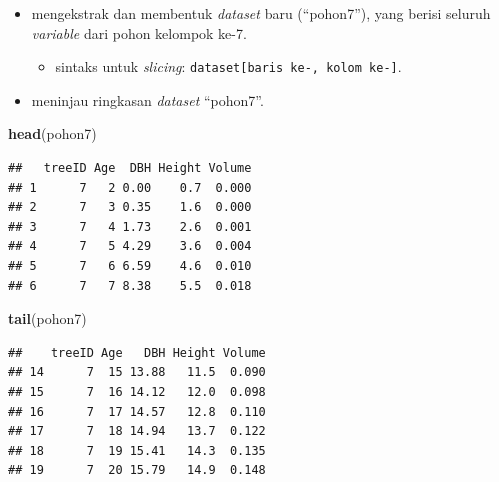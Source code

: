 \documentclass[
  12pt,
  a4paper,
]{scrbook}
\newenvironment{Shaded}{\begin{snugshade}}{\end{snugshade}}
\newcommand{\DecValTok}[1]{\textcolor[rgb]{0.00,0.00,0.81}{#1}}
\newcommand{\KeywordTok}[1]{\textcolor[rgb]{0.13,0.29,0.53}{\textbf{#1}}}
\newcommand{\NormalTok}[1]{#1}
\newcommand{\OperatorTok}[1]{\textcolor[rgb]{0.81,0.36,0.00}{\textbf{#1}}}
\newcommand{\StringTok}[1]{\textcolor[rgb]{0.31,0.60,0.02}{#1}}
\providecommand{\tightlist}{%
  \setlength{\itemsep}{0pt}\setlength{\parskip}{0pt}}
\begin{document}
\begin{itemize}
\tightlist
\item
  mengekstrak dan membentuk \emph{dataset} baru (``pohon7''), yang
  berisi seluruh \emph{variable} dari pohon kelompok ke-7.

  \begin{itemize}
  \tightlist
  \item
    sintaks untuk \emph{slicing}:
    \texttt{dataset{[}baris\ ke-,\ kolom\ ke-{]}}.
  \end{itemize}
\end{itemize}

\begin{Shaded}
\end{Shaded}

\begin{itemize}
\tightlist
\item
  meninjau ringkasan \emph{dataset} ``pohon7''.
\end{itemize}

\begin{Shaded}
\begin{Highlighting}[]
\KeywordTok{head}\NormalTok{(pohon7)}
\end{Highlighting}
\end{Shaded}

\begin{verbatim}
##   treeID Age  DBH Height Volume
## 1      7   2 0.00    0.7  0.000
## 2      7   3 0.35    1.6  0.000
## 3      7   4 1.73    2.6  0.001
## 4      7   5 4.29    3.6  0.004
## 5      7   6 6.59    4.6  0.010
## 6      7   7 8.38    5.5  0.018
\end{verbatim}

\newpage

\begin{Shaded}
\begin{Highlighting}[]
\KeywordTok{tail}\NormalTok{(pohon7)}
\end{Highlighting}
\end{Shaded}

\begin{verbatim}
##    treeID Age   DBH Height Volume
## 14      7  15 13.88   11.5  0.090
## 15      7  16 14.12   12.0  0.098
## 16      7  17 14.57   12.8  0.110
## 17      7  18 14.94   13.7  0.122
## 18      7  19 15.41   14.3  0.135
## 19      7  20 15.79   14.9  0.148
\end{verbatim}
\end{document}

